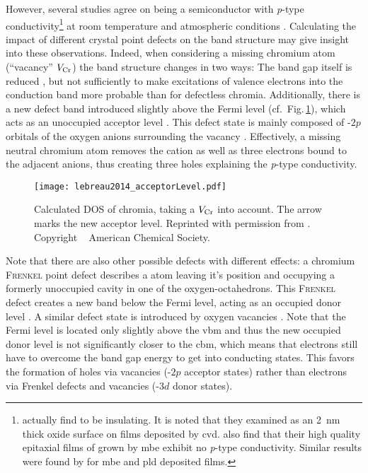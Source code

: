 However, several studies agree on  being a semiconductor with \textit{p}-type conductivity\footnote{
    \textcite{cheng2001a} actually find  to be insulating. It is noted that they examined  as an \qty{2}{\nm} thick oxide surface on  films deposited by \gls{cvd}.
    \textcite{farrell2015} also find that their high quality epitaxial films of  grown by \gls{mbe} exhibit no \textit{p}-type conductivity.
    Similar results were found by \textcite{kehoe2016} for \gls{mbe} and \gls{pld} deposited films.
}
at room temperature and atmospheric conditions
    \cite{kofstad1980,cheng1996,caricato2010,lebreau2014,mi2018,singh2019,polyakov2022a}.
Calculating the impact of different crystal point defects on the band structure may give insight into these observations.
Indeed, when considering a missing chromium atom (\enquote{vacancy} $V_{\ce{Cr}}$) the band structure changes in two ways:
The band gap itself is reduced \cite{mi2018}, but not sufficiently to make excitations of valence electrons into the conduction band more probable than for defectless chromia.
Additionally, there is a new defect band introduced slightly above the Fermi level (cf.\ Fig.\,\ref{Fig:lebreau2014_acceptorLevel}), which acts as an unoccupied acceptor level
    \cite{mi2018}.
This defect state is mainly composed of -$2p$ orbitals of the oxygen anions surrounding the vacancy
    \cite{lebreau2014}.
Effectively, a missing neutral chromium atom removes the  cation as well as three electrons bound to the adjacent  anions, thus creating three holes \cite{lebreau2014} explaining the \textit{p}-type conductivity.
\begin{figure}
    \centering
    \texttt{[image: lebreau2014\_acceptorLevel.pdf]}
    \caption{Calculated \acrfull{DOS} of chromia, taking a $V_{\ce{Cr}}$ into account.
    The arrow marks the new acceptor level.
    Reprinted with permission from \textcite{lebreau2014}. Copyright \textcopyright\ \citeyear{lebreau2014} American Chemical Society.}
    \label{Fig:lebreau2014_acceptorLevel}
\end{figure}

Note that there are also other possible defects with different effects:
a chromium \textsc{Frenkel} point defect describes a  atom leaving it's position and occupying a formerly unoccupied cavity in one of the oxygen-octahedrons.
This \textsc{Frenkel} defect creates a new band below the Fermi level, acting as an occupied donor level
    \cite{lebreau2014}.
A similar defect state is introduced by oxygen vacancies
    \cite{mi2018}.
Note that the Fermi level is located only slightly above the \gls{vbm} and thus the new occupied donor level is not significantly closer to the \gls{cbm}, which means that electrons still have to overcome the band gap energy to get into conducting states.
This favors the formation of holes via  vacancies (-$2p$ acceptor states) rather than electrons via  Frenkel defects and  vacancies (-$3d$ donor states).


